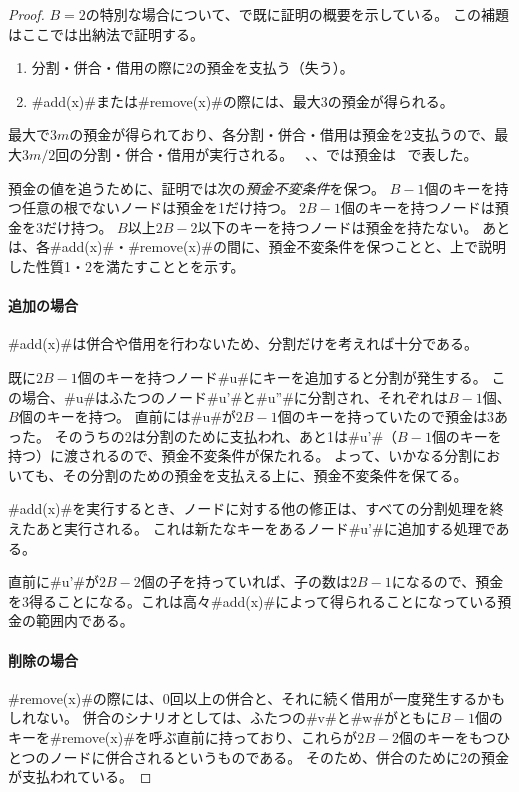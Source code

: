 \begin{proof}
   $B=2$の特別な場合について、で既に証明の概要を示している。
   この補題はここでは出納法で証明する。
  \begin{enumerate}
    \item 分割・併合・借用の際に2の預金を支払う（失う）。
    \item #add(x)#または#remove(x)#の際には、最大3の預金が得られる。
  \end{enumerate}
  最大で$3m$の預金が得られており、各分割・併合・借用は預金を2支払うので、最大$3m/2$回の分割・併合・借用が実行される。
  ~、、では預金は \cent\ で表した。

  預金の値を追うために、証明では次の\emph{預金不変条件}を保つ。
  $B-1$個のキーを持つ任意の根でないノードは預金を1だけ持つ。
  $2B-1$個のキーを持つノードは預金を3だけ持つ。
  $B$以上$2B-2$以下のキーを持つノードは預金を持たない。
  あとは、各#add(x)#・#remove(x)#の間に、預金不変条件を保つことと、上で説明した性質1・2を満たすこととを示す。

  \paragraph{追加の場合}
  #add(x)#は併合や借用を行わないため、分割だけを考えれば十分である。

  既に$2B-1$個のキーを持つノード#u#にキーを追加すると分割が発生する。
  この場合、#u#はふたつのノード#u'#と#u''#に分割され、それぞれは$B-1$個、$B$個のキーを持つ。
  直前には#u#が$2B-1$個のキーを持っていたので預金は3あった。
  そのうちの2は分割のために支払われ、あと1は#u'#（$B-1$個のキーを持つ）に渡されるので、預金不変条件が保たれる。
  よって、いかなる分割においても、その分割のための預金を支払える上に、預金不変条件を保てる。

  #add(x)#を実行するとき、ノードに対する他の修正は、すべての分割処理を終えたあと実行される。
  これは新たなキーをあるノード#u'#に追加する処理である。

  直前に#u'#が$2B-2$個の子を持っていれば、子の数は$2B-1$になるので、預金を3得ることになる。これは高々#add(x)#によって得られることになっている預金の範囲内である。

  \paragraph{削除の場合}
  #remove(x)#の際には、0回以上の併合と、それに続く借用が一度発生するかもしれない。
  併合のシナリオとしては、ふたつの#v#と#w#がともに$B-1$個のキーを#remove(x)#を呼ぶ直前に持っており、これらが$2B-2$個のキーをもつひとつのノードに併合されるというものである。
  そのため、併合のために2の預金が支払われている。


\end{proof}
